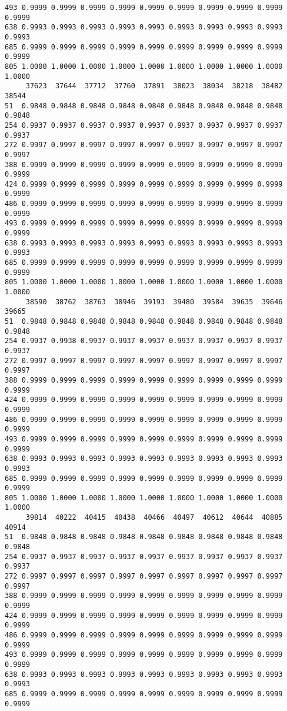 \documentclass[
]{report}
\begin{document}
\begin{verbatim}
493 0.9999 0.9999 0.9999 0.9999 0.9999 0.9999 0.9999 0.9999 0.9999 0.9999
638 0.9993 0.9993 0.9993 0.9993 0.9993 0.9993 0.9993 0.9993 0.9993 0.9993
685 0.9999 0.9999 0.9999 0.9999 0.9999 0.9999 0.9999 0.9999 0.9999 0.9999
805 1.0000 1.0000 1.0000 1.0000 1.0000 1.0000 1.0000 1.0000 1.0000 1.0000
     37623  37644  37712  37760  37891  38023  38034  38218  38482  38544
51  0.9848 0.9848 0.9848 0.9848 0.9848 0.9848 0.9848 0.9848 0.9848 0.9848
254 0.9937 0.9937 0.9937 0.9937 0.9937 0.9937 0.9937 0.9937 0.9937 0.9937
272 0.9997 0.9997 0.9997 0.9997 0.9997 0.9997 0.9997 0.9997 0.9997 0.9997
388 0.9999 0.9999 0.9999 0.9999 0.9999 0.9999 0.9999 0.9999 0.9999 0.9999
424 0.9999 0.9999 0.9999 0.9999 0.9999 0.9999 0.9999 0.9999 0.9999 0.9999
486 0.9999 0.9999 0.9999 0.9999 0.9999 0.9999 0.9999 0.9999 0.9999 0.9999
493 0.9999 0.9999 0.9999 0.9999 0.9999 0.9999 0.9999 0.9999 0.9999 0.9999
638 0.9993 0.9993 0.9993 0.9993 0.9993 0.9993 0.9993 0.9993 0.9993 0.9993
685 0.9999 0.9999 0.9999 0.9999 0.9999 0.9999 0.9999 0.9999 0.9999 0.9999
805 1.0000 1.0000 1.0000 1.0000 1.0000 1.0000 1.0000 1.0000 1.0000 1.0000
     38590  38762  38763  38946  39193  39480  39584  39635  39646  39665
51  0.9848 0.9848 0.9848 0.9848 0.9848 0.9848 0.9848 0.9848 0.9848 0.9848
254 0.9937 0.9938 0.9937 0.9937 0.9937 0.9937 0.9937 0.9937 0.9937 0.9937
272 0.9997 0.9997 0.9997 0.9997 0.9997 0.9997 0.9997 0.9997 0.9997 0.9997
388 0.9999 0.9999 0.9999 0.9999 0.9999 0.9999 0.9999 0.9999 0.9999 0.9999
424 0.9999 0.9999 0.9999 0.9999 0.9999 0.9999 0.9999 0.9999 0.9999 0.9999
486 0.9999 0.9999 0.9999 0.9999 0.9999 0.9999 0.9999 0.9999 0.9999 0.9999
493 0.9999 0.9999 0.9999 0.9999 0.9999 0.9999 0.9999 0.9999 0.9999 0.9999
638 0.9993 0.9993 0.9993 0.9993 0.9993 0.9993 0.9993 0.9993 0.9993 0.9993
685 0.9999 0.9999 0.9999 0.9999 0.9999 0.9999 0.9999 0.9999 0.9999 0.9999
805 1.0000 1.0000 1.0000 1.0000 1.0000 1.0000 1.0000 1.0000 1.0000 1.0000
     39814  40222  40415  40438  40466  40497  40612  40644  40885  40914
51  0.9848 0.9848 0.9848 0.9848 0.9848 0.9848 0.9848 0.9848 0.9848 0.9848
254 0.9937 0.9937 0.9937 0.9937 0.9937 0.9937 0.9937 0.9937 0.9937 0.9937
272 0.9997 0.9997 0.9997 0.9997 0.9997 0.9997 0.9997 0.9997 0.9997 0.9997
388 0.9999 0.9999 0.9999 0.9999 0.9999 0.9999 0.9999 0.9999 0.9999 0.9999
424 0.9999 0.9999 0.9999 0.9999 0.9999 0.9999 0.9999 0.9999 0.9999 0.9999
486 0.9999 0.9999 0.9999 0.9999 0.9999 0.9999 0.9999 0.9999 0.9999 0.9999
493 0.9999 0.9999 0.9999 0.9999 0.9999 0.9999 0.9999 0.9999 0.9999 0.9999
638 0.9993 0.9993 0.9993 0.9993 0.9993 0.9993 0.9993 0.9993 0.9993 0.9993
685 0.9999 0.9999 0.9999 0.9999 0.9999 0.9999 0.9999 0.9999 0.9999 0.9999

\end{verbatim}
\end{document}
